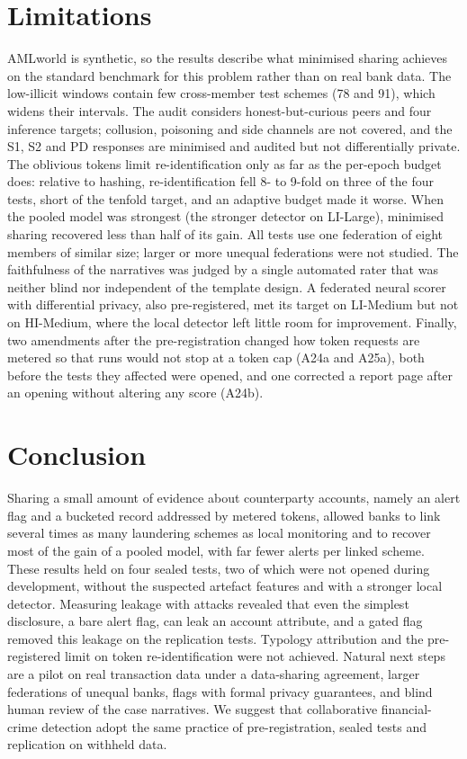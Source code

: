 \documentclass[conference]{IEEEtran}
\begin{document}
\section{Limitations}\label{sec:limits}
AMLworld is synthetic, so the results describe what minimised sharing achieves on the
standard benchmark for this problem rather than on real bank data. The low-illicit windows
contain few cross-member test schemes (78 and 91), which widens their intervals. The audit
considers honest-but-curious peers and four inference targets; collusion, poisoning and
side channels are not covered, and the S1, S2 and PD responses are minimised and audited
but not differentially private. The oblivious tokens limit re-identification only as far as
the per-epoch budget does: relative to hashing, re-identification fell 8- to 9-fold on three
of the four tests, short of the tenfold target, and an adaptive budget made it worse. When
the pooled model was strongest (the stronger detector on LI-Large), minimised sharing
recovered less than half of its gain. All tests use one federation of eight members of
similar size; larger or more unequal federations were not studied. The faithfulness of the narratives was judged by a single
automated rater that was neither blind nor independent of the template design. A federated
neural scorer with differential privacy, also pre-registered, met its target on LI-Medium
but not on HI-Medium, where the local detector left little room for improvement. Finally,
two amendments after the pre-registration changed how token requests are metered so that
runs would not stop at a token cap (A24a and A25a), both before the tests they affected
were opened, and one corrected a report page after an opening without altering any score
(A24b).

\section{Conclusion}
Sharing a small amount of evidence about counterparty accounts, namely an alert flag and a
bucketed record addressed by metered tokens, allowed banks to link several times as many
laundering schemes as local monitoring and to recover most of the gain of a pooled model,
with far fewer alerts per linked scheme. These results held on four sealed tests, two of
which were not opened during development, without the suspected artefact features and with
a stronger local detector. Measuring leakage with attacks revealed that even the simplest
disclosure, a bare alert flag, can leak an account attribute, and a gated flag removed this
leakage on the replication tests. Typology attribution and the pre-registered limit on token
re-identification were not achieved. Natural next steps are a pilot on real transaction
data under a data-sharing agreement, larger federations of unequal banks, flags with formal
privacy guarantees, and blind human review of the case narratives. We suggest that
collaborative financial-crime detection adopt the same practice of pre-registration, sealed
tests and replication on withheld data.
\end{document}

